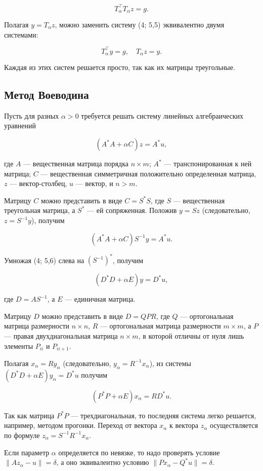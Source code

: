\documentclass[a4paper,14pt]{extarticle}
\begin{document}
\[
T_\alpha^\top T_\alpha z = g. \tag{4; 5,5}
\]

Полагая \(y = T_\alpha z\), можно заменить систему (4; 5,5) эквивалентно двумя системами:

\[
T_\alpha^\top y = g, \quad T_\alpha z = y.
\]

Каждая из этих систем решается просто, так как их матрицы треугольные.

\subsection{Метод Воеводина}

Пусть для разных \(\alpha > 0\) требуется решать систему линейных алгебраических уравнений

\[
(A^*A + \alpha C) z = A^*u,
\]

где \(A\) — вещественная матрица порядка \(n \times m\); \(A^*\) — транспонированная к ней матрица; \(C\) — вещественная симметричная положительно определенная матрица, \(z\) — вектор-столбец, \(u\) — вектор, и \(n > m\).

Матрицу \(C\) можно представить в виде \(C = S^* S\), где \(S\) — вещественная треугольная матрица, а \(S^*\) — ей сопряженная. Положив \(y = Sz\) (следовательно, \(z = S^{-1}y\)), получим

\[
(A^*A + \alpha C) S^{-1} y = A^*u. \tag{4; 5,6}
\]

Умножая (4; 5,6) слева на \((S^{-1})^*\), получим

\[
(D^*D + \alpha E) y = D^*u,
\]

где \(D = A S^{-1}\), а \(E\) — единичная матрица.

Матрицу \(D\) можно представить в виде \(D = Q P R\), где \(Q\) — ортогональная матрица размерности \(n \times n\), \(R\) — ортогональная матрица размерности \(m \times m\), а \(P\) — правая двухдиагональная матрица \(n \times m\), в которой отличны от нуля лишь элементы \(P_{ii}\) и \(P_{ii+1}\).

Полагая \(x_\alpha = R y_\alpha\) (следовательно, \(y_\alpha = R^{-1} x_\alpha\)), из системы \((D^*D + \alpha E) y_\alpha = D^*u\) получим

\[
(P^*P + \alpha E) x_\alpha = R D^*u.
\]

Так как матрица \(P^*P\) — трехдиагональная, то последняя система легко решается, например, методом прогонки. Переход от вектора \(x_\alpha\) к вектора \(z_\alpha\) осуществляется по формуле \(z_\alpha = S^{-1} R^{-1} x_\alpha\).

Если параметр \(\alpha\) определяется по невязке, то надо проверять условие \(\|A z_\alpha - u\| = \delta\), а оно эквивалентно условию \(\|P x_\alpha - Q^* u\| = \delta\).
\end{document}
